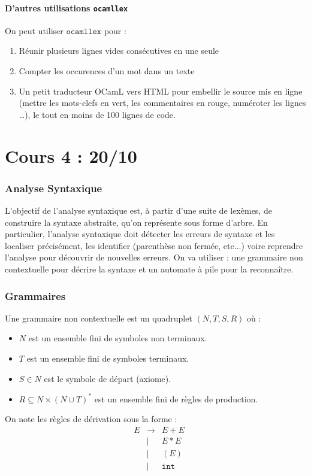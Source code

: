 \documentclass{cours}
\begin{document}
\subsection{D'autres utilisations \texttt{ocamllex}}
On peut utiliser $\texttt{ocamllex}$ pour :
\begin{enumerate}
    \item Réunir plusieurs lignes vides consécutives en une seule
    \item Compter les occurences d'un mot dans un texte
    \item Un petit traducteur OCamL vers HTML pour embellir le source mis en ligne (mettre les mots-clefs en vert, les commentaires en rouge, numéroter les lignes \dots), le tout en moins de 100 lignes de code.
\end{enumerate}

\newpage
\part[Analyse Syntaxique]{Cours 4 : 20/10}\label{part:AnalyseSyntaxique}
\localtableofcontents
\section{Analyse Syntaxique}
L'objectif de l'analyse syntaxique est, à partir d'une suite de lexèmes, de construire la syntaxe abstraite, qu'on représente sous forme d'arbre. En particulier, l'analyse syntaxique doit détecter les erreurs de syntaxe et les localiser précisément, les identifier (parenthèse non fermée, etc...) voire reprendre l'analyse pour découvrir de nouvelles erreurs. On va utiliser : une grammaire non contextuelle pour décrire la syntaxe et un automate à pile pour la reconnaître. 

\section{Grammaires}
\begin{definition}
    Une grammaire non contextuelle est un quadruplet $(N, T, S, R)$ où :
    \begin{itemize}
        \item $N$ est un ensemble fini de symboles non terminaux.
        \item $T$ est un ensemble fini de symboles terminaux.
        \item $S \in N$ est le symbole de départ (axiome).
        \item $R \subseteq N \times (N \cup T)^{*}$ est un ensemble fini de règles de production.
    \end{itemize}
\end{definition}
On note les règles de dérivation sous la forme : 
\begin{equation*}
    \begin{aligned}
        &E &\rightarrow &E + E\\
        & &\mid &E*E\\
        & &\mid &(E)\\
        & &\mid &\texttt{int}
    \end{aligned}
\end{equation*}
\end{document}
